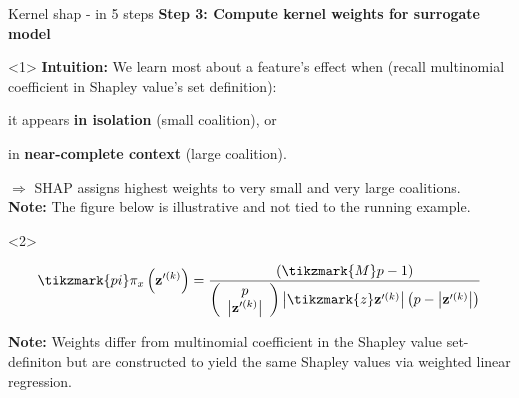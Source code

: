 \documentclass[10pt,compress,t,notes=noshow, xcolor=table]{beamer}
\begin{document}
\begin{framev}[fs=small,align=top]{Kernel shap - in 5 steps}
\textbf{Step 3: Compute kernel weights for surrogate model}\\
\spacer[0.25]
\begin{onlyenv}<1>
\textbf{Intuition:}  
We learn most about a feature’s effect when (recall multinomial coefficient in Shapley value's set definition):
\begin{itemizeM}
\item it appears \textbf{in isolation} (small coalition), or
\item in \textbf{near-complete context} (large coalition).
\end{itemizeM}
\(\Rightarrow\) SHAP assigns highest weights to very small and very large coalitions.\\
\spacer[0.25]
\textbf{Note:} The figure below is illustrative and not tied to the running example.
\end{onlyenv}
\begin{onlyenv}<2>
\spacer[2.5]
\begin{exampleblock}{}
\[
\tikzmark{pi}\pi_{x}\left(\mathbf{z}^{\prime (k)}\right)=\frac{(
\tikzmark{M}p-1)}{\left(\begin{array}{c} p \\\left|\mathbf{z}^{\prime (k)}\right|\end{array}\right)\left|
\tikzmark{z}\mathbf{z}^{\prime (k)}\right|\left(p-\left|\mathbf{z}^{\prime (k)}\right|\right)}
\]
\end{exampleblock}
\spacer[4.5]
\textbf{Note:} Weights differ from multinomial coefficient in the Shapley value set-definiton but are constructed to yield the same Shapley values via weighted linear regression.
\end{onlyenv}



\end{framev}
\end{document}
